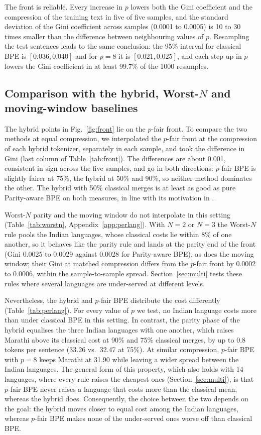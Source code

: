 The front is reliable. Every increase in $p$ lowers both the Gini coefficient and the
compression of the training text in five of five samples, and the standard deviation of the
Gini coefficient across samples (0.0001 to 0.0005) is 10 to 30 times smaller than the
difference between neighbouring values of $p$. Resampling the test sentences leads to the
same conclusion: the 95\% interval for classical BPE is $[0.036,0.040]$ and for $p=8$ it is
$[0.021,0.025]$, and each step up in $p$ lowers the Gini coefficient in at least 99.7\% of
the 1000 resamples.

\subsection{Comparison with the hybrid, Worst-$N$ and moving-window baselines}
\label{sec:hybrid}

The hybrid points in Fig.~\ref{fig:front} lie on the $p$-fair front. To compare the two
methods at equal compression, we interpolated the $p$-fair front at the compression of each
hybrid tokenizer, separately in each sample, and took the difference in Gini (last column
of Table~\ref{tab:front}). The differences are about 0.001, consistent in sign across the
five samples, and go in both directions: $p$-fair BPE is slightly fairer at 75\%, the hybrid
at 50\% and 90\%, so neither method dominates the other. The hybrid with 50\% classical merges is at least as good as pure Parity-aware BPE on both
measures, in line with its motivation in \citet{foroutan2026}.


Worst-$N$ parity and the moving window do not interpolate in this setting
(Table~\ref{tab:worstn}, Appendix~\ref{app:perlang}). With $N=2$ or $N=3$ the Worst-$N$ rule
pools the Indian languages, whose classical costs lie within 8\% of one another, so it
behaves like the parity rule and lands at the parity end of the front (Gini 0.0025 to
0.0029 against 0.0028 for Parity-aware BPE), as does the moving window; their Gini at
matched compression differs from the $p$-fair front by 0.0002 to 0.0006, within the
sample-to-sample spread. Section~\ref{sec:multi} tests these rules where several languages
are under-served at different levels.

Nevertheless, the hybrid and $p$-fair BPE distribute the cost differently (Table~\ref{tab:perlang}).
For every value of $p$ we test, no Indian language costs more than under classical BPE in
this setting. In contrast, the parity phase of the hybrid equalises the three Indian languages with one
another, which raises Marathi above its classical cost at 90\% and 75\% classical merges,
by up to 0.8 tokens per sentence (33.26 vs.\ 32.47 at 75\%). At similar compression, $p$-fair BPE
with $p=8$ keeps Marathi at 31.90 while leaving a wider spread between the Indian languages.
The general form of this property, which also holds with 14 languages, where every rule
raises the cheapest ones (Section~\ref{sec:multi}), is that $p$-fair BPE never raises a
language that costs more than the classical mean, whereas the hybrid does. Consequently,
the choice between the two depends on the goal: the hybrid moves closer to equal cost among
the Indian languages, whereas $p$-fair BPE makes none of the under-served ones worse off
than classical BPE.


